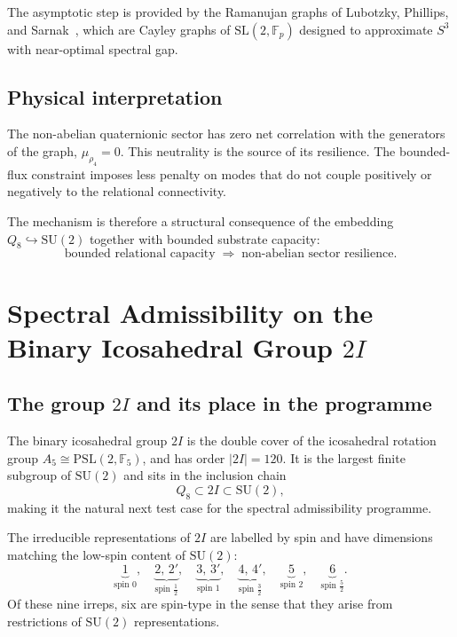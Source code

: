 \documentclass[11pt,a4paper]{article}
\begin{document}
      The asymptotic step is provided by the Ramanujan graphs of
      Lubotzky, Phillips, and Sarnak~\cite{LPS1988}, which are Cayley graphs of
      $\mathrm{SL}(2,\mathbb{F}_p)$ designed to approximate $S^3$ with near-optimal
      spectral gap.

    \subsection{Physical interpretation}
      \label{sec:step4-physics}

      The non-abelian quaternionic sector has zero net correlation with the
      generators of the graph, $\mu_{\rho_4} = 0$.
      This neutrality is the source of its resilience.
      The bounded-flux constraint imposes less penalty on modes that do not couple
      positively or negatively to the relational connectivity.

      The mechanism is therefore a structural consequence of the embedding
      $Q_8 \hookrightarrow \mathrm{SU}(2)$ together with bounded substrate capacity:
      \begin{equation}
        \text{bounded relational capacity}
        \;\Longrightarrow\;
        \text{non-abelian sector resilience}.
      \end{equation}

  \section{Spectral Admissibility on the Binary Icosahedral Group $2I$}
    \label{sec:step5}

    \subsection{The group $2I$ and its place in the programme}
      \label{sec:step5-intro}

      The binary icosahedral group $2I$ is the double cover of the icosahedral
      rotation group $A_5 \cong \mathrm{PSL}(2,\mathbb{F}_5)$, and has order
      $|2I| = 120$.
      It is the largest finite subgroup of $\mathrm{SU}(2)$ and sits in the
      inclusion chain
      \begin{equation}
        Q_8 \subset 2I \subset \mathrm{SU}(2),
        \label{eq:chain}
      \end{equation}
      making it the natural next test case for the spectral admissibility
      programme.

      The irreducible representations of $2I$ are labelled by spin and have
      dimensions matching the low-spin content of $\mathrm{SU}(2)$:
      \begin{equation}
        \underbrace{1}_{\text{spin }0},\quad
        \underbrace{2,\,2'}_{\text{spin }\tfrac{1}{2}},\quad
        \underbrace{3,\,3'}_{\text{spin }1},\quad
        \underbrace{4,\,4'}_{\text{spin }\tfrac{3}{2}},\quad
        \underbrace{5}_{\text{spin }2},\quad
        \underbrace{6}_{\text{spin }\tfrac{5}{2}}.
        \label{eq:2I-irreps}
      \end{equation}
      Of these nine irreps, six are spin-type in the sense that they arise from
      restrictions of $\mathrm{SU}(2)$ representations.
\end{document}
